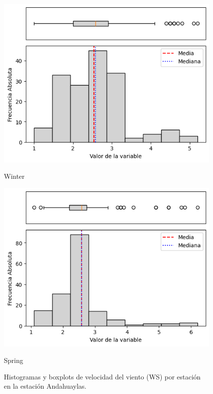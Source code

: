 \begin{figure}[H]
\begin{minipage}{0.30\textwidth}
  \includegraphics[width=\linewidth]{resultados/por_estacion_del_anio/boxplot_clases_por_estacion/Andahuaylas/WS_HistBoxplot_Winter.png}
  \caption*{Winter}
\end{minipage}
\hfill
\begin{minipage}{0.30\textwidth}
  \includegraphics[width=\linewidth]{resultados/por_estacion_del_anio/boxplot_clases_por_estacion/Andahuaylas/WS_HistBoxplot_Spring.png}
  \caption*{Spring}
\end{minipage}
\caption{Histogramas y boxplots de velocidad del viento (WS) por estación en la estación Andahuaylas.}
\label{fig:andahuaylas_ws_hist}
\end{figure}

